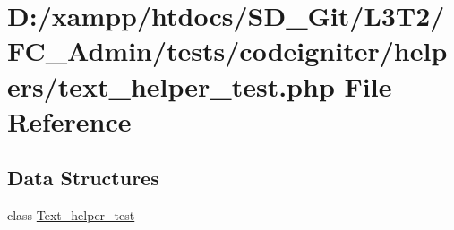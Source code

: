 \hypertarget{text__helper__test_8php}{}\section{D\+:/xampp/htdocs/\+S\+D\+\_\+\+Git/\+L3\+T2/\+F\+C\+\_\+\+Admin/tests/codeigniter/helpers/text\+\_\+helper\+\_\+test.php File Reference}
\label{text__helper__test_8php}
\subsection*{Data Structures}
\begin{DoxyCompactItemize}
\item 
class \hyperlink{class_text__helper__test}{Text\+\_\+helper\+\_\+test}
\end{DoxyCompactItemize}
